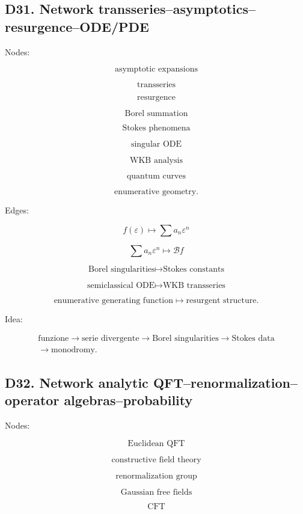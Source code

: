 \documentclass[11pt]{article}
\begin{document}
\subsection{D31. Network transseries--asymptotics--resurgence--ODE/PDE}

Nodes:

\[
\text{asymptotic expansions}
\]

\[
\text{transseries}
\]

\[
\text{resurgence}
\]

\[
\text{Borel summation}
\]

\[
\text{Stokes phenomena}
\]

\[
\text{singular ODE}
\]

\[
\text{WKB analysis}
\]

\[
\text{quantum curves}
\]

\[
\text{enumerative geometry}.
\]

Edges:

\[
f(\varepsilon)\mapsto \sum a_n\varepsilon^n
\]

\[
\sum a_n\varepsilon^n\mapsto \mathcal Bf
\]

\[
\text{Borel singularities}\mapsto \text{Stokes constants}
\]

\[
\text{semiclassical ODE}\mapsto \text{WKB transseries}
\]

\[
\text{enumerative generating function}\mapsto \text{resurgent structure}.
\]

Idea:

\[
\begin{gathered}
\text{funzione} \to \text{serie divergente} \to \text{Borel singularities} \to \text{Stokes data} \\
\to \text{monodromy}.
\end{gathered}
\]



\subsection{D32. Network analytic QFT--renormalization--operator algebras--probability}

Nodes:

\[
\text{Euclidean QFT}
\]

\[
\text{constructive field theory}
\]

\[
\text{renormalization group}
\]

\[
\text{Gaussian free fields}
\]

\[
\text{CFT}
\]
\end{document}
